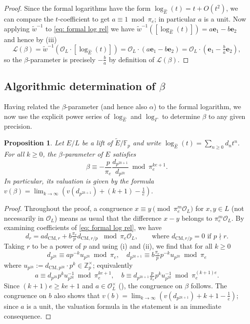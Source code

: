 \documentclass{amsart}
\newtheorem{proposition}[theorem]{Proposition}
\theoremstyle{definition}
\newcommand{\Z}{\mathbb{Z}}
\newcommand{\isom}{\tilde{w}}
\numberwithin{theorem}{section}
\numberwithin{equation}{section}
\begin{document}
\begin{proof}
Since the formal logarithms have the form $\log_{\hat{E}}(t)=t+O(t^2)$, we can compare the $t$-coefficient to get $a \equiv 1 \bmod{\pi_e}$; in particular $a$ is a unit.
Now applying $\isom^{-1}$ to \eqref{eq: formal log rel} we have $\isom^{-1}([\log_{\hat{E}}(t)])=a\mathbf{e}_1 - b\mathbf{e}_2$
and hence by (iii)
\[
\mathcal{L}(\beta) = \isom^{-1}(\mathcal{O}_L \cdot [\log_{\hat{E}}(t)]) = \mathcal{O}_L \cdot (a\mathbf{e}_1 - b\mathbf{e}_2) = \mathcal{O}_L \cdot (\mathbf{e}_1 - \tfrac{b}{a}\mathbf{e}_2),
\]
so the $\beta$-parameter is precisely $-\frac{b}{a}$ by definition of $\mathcal{L}(\beta)$.
\end{proof}






\subsection{Algorithmic determination of $\beta$}\label{subsect: beta algorithm}

Having related the $\beta$-parameter (and hence also $\alpha$) to the formal logarithm, we now use the explicit power series of $\log_{\hat{E}}$ and $\log_{\Gamma}$ to determine $\beta$ to any given precision.

\begin{proposition}\label{prop: beta algorithm}
Let $E/L$ be a lift of $\tilde{E}/\mathbb{F}_p$ and write $\log_{\hat{E}}(t)= \sum_{n \geq 0} d_nt^n$. For all $k \geq 0$, the $\beta$-parameter of $E$ satisfies 
\[
\beta \equiv - \frac{p}{\pi_e}\frac{d_{p^{2k+1}}}{d_{p^{2k}}} \bmod \pi_e^{ke+1}.
\]
In particular, its valuation is given by the formula
$
v(\beta)=\lim_{k\to\infty}\left(v(d_{p^{2k+1}})+(k+1)-\frac{1}{e}\right).
$
\end{proposition}

\begin{proof}
Throughout the proof, a congruence $x \equiv y \pmod{\pi_e^m \mathcal{O}_L}$ for $x, y \in L$ (not necessarily in $\mathcal{O}_L$) means as usual that the difference $x-y$ belongs to $\pi_e^m \mathcal{O}_L$.
By examining coefficients of \eqref{eq: formal log rel}, we have
\[
d_r = ad_{\mathrm{CM},r} + b\tfrac{\pi_e}{p}d_{\mathrm{CM},r/p} \,\, \bmod{\pi_e\mathcal{O}_L}, \qquad \text{where } d_{\mathrm{CM},r/p} =0 \text{ if } p\nmid r. 
\]
Taking $r$ to be a power of $p$ and using (i) and (ii), we find that for all $k \geq 0$
\[
d_{p^{2k}} \equiv ap^{-k}u_{p^{2k}} \bmod{\pi_e}, \quad d_{p^{2k+1}} \equiv b\tfrac{\pi_e}{p}p^{-k}u_{p^{2k}} \bmod{\pi_e}
\]
where $u_{p^{2k}}:=d_{\mathrm{CM},p^{2k}} \cdot p^k \in \Z_p^{\times}$; equivalently
\[
a \equiv d_{p^{2k}}p^{k}u_{p^{2k}}^{-1} \bmod{\pi_e^{ke+1}}, \quad b \equiv d_{p^{2k+1}}\tfrac{p}{\pi_e}p^{k}u_{p^{2k}}^{-1} \bmod{\pi_e^{(k+1)e}}.
\]
Since $(k+1)e \geq ke+1$ and $a \in \mathcal{O}_L^{\times}$ (), the congruence on $\beta$ follows. The congruence on $b$ also shows that $v(b) = \lim_{k \to \infty} \left(v(d_{p^{2k+1}}) + k+1-\frac{1}{e}\right)$; since $a$ is a unit, the valuation formula in the statement is an immediate consequence.
\end{proof}
\end{document}
